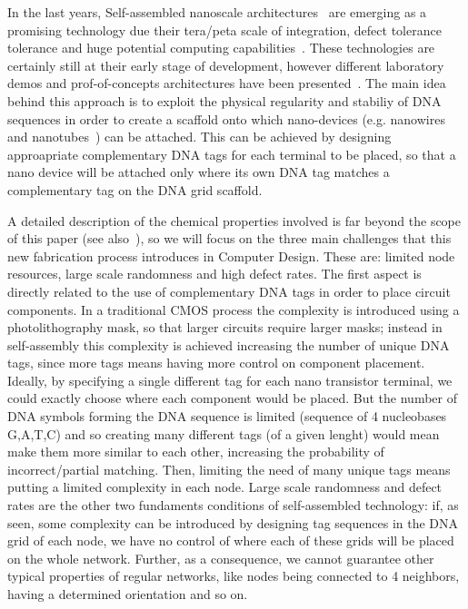 \documentclass[final,journal,letterpaper]{IEEEtran}
\begin{document}
In the last years, Self-assembled nanoscale architectures~\cite{TOOD}
are emerging as a promising technology due their tera/peta scale of
integration, defect tolerance tolerance and huge potential computing
capabilities~\cite{TODO}. These technologies are certainly still at
their early stage of development, however different laboratory demos and
prof-of-concepts architectures have been presented~\cite{TODO}.
The main idea behind this approach is to exploit the physical regularity and
stabiliy of DNA sequences in order to create a scaffold onto which
nano-devices (e.g. nanowires and nanotubes~\cite{TODO}) can be
attached. This can be achieved by designing approapriate complementary DNA tags for
each terminal to be placed, so that a nano device will be attached
only where its own DNA tag matches a complementary tag on the DNA grid
scaffold.

A detailed description of the chemical properties involved is far beyond
the scope of this paper (see also~\cite{}), so we will focus on the
three main challenges that this new fabrication process introduces in Computer Design. These are:
limited node resources, large scale randomness and high defect rates.
The first aspect is directly related to the use of complementary DNA
tags in order to place circuit components. In a traditional CMOS
process the complexity is introduced using a photolithography mask, so that larger
circuits require larger masks; instead in self-assembly this
complexity is achieved increasing the number of unique DNA tags, since
more tags means having more control on component placement. Ideally,
by specifying a single different tag for each nano transistor terminal,
we could exactly choose where each component would be placed. But the
number of DNA symbols forming the DNA sequence is limited (sequence
of 4 nucleobases G,A,T,C) and so creating many different tags (of a
given lenght) would mean make them more similar to
each other, increasing the probability of incorrect/partial matching. Then,
limiting the need of many unique tags means putting a limited
complexity in each node. Large scale randomness and defect rates are
the other two fundaments conditions of self-assembled technology:
if, as seen, some complexity can be introduced by designing tag sequences in the
DNA grid of each node, we have no control of where each of these grids
will be placed on the whole network. Further, as a consequence, we cannot guarantee other
typical properties of regular networks, like nodes being connected to 4
neighbors, having a determined orientation and so on.
\end{document}
